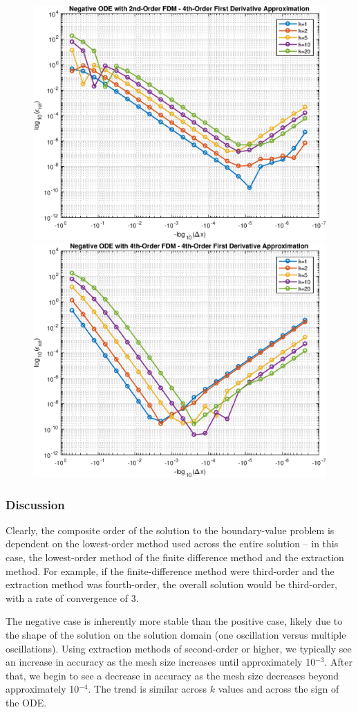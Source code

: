 \documentclass[10pt, reqno]{article}		%
\numberwithin{equation}{section}
\begin{document}
\begin{figure}[H]
	\begin{center}
		\includegraphics[width=0.46\linewidth]{negative_ode_order_2_fd_order_4}
		\includegraphics[width=0.46\linewidth]{negative_ode_order_4_fd_order_4}
	\end{center}
\end{figure}

\subsubsection{Discussion}

Clearly, the composite order of the solution to the boundary-value problem is dependent on the lowest-order method used across the entire solution -- in this case, the lowest-order method of the finite difference method and the extraction method. For example, if the finite-difference method were third-order and the extraction method was fourth-order, the overall solution would be third-order, with a rate of convergence of 3.

The negative case is inherently more stable than the positive case, likely due to the shape of the solution on the solution domain (one oscillation versus multiple oscillations). Using extraction methods of second-order or higher, we typically see an increase in accuracy as the mesh size increases until approximately 10$^{-3}$. After that, we begin to see a decrease in accuracy as the mesh size decreases beyond approximately 10$^{-4}$. The trend is similar across $k$ values and across the sign of the ODE.
\end{document}
